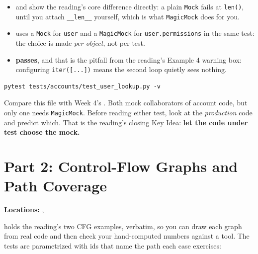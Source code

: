 \documentclass[11pt]{article}
\begin{document}
\begin{itemize}
\item {} and
show the reading's core difference directly: a plain \texttt{Mock}
fails at \texttt{len()}, until you attach \texttt{\_\_len\_\_} yourself,
which is what \texttt{MagicMock} does for you.
\item {} uses
a \texttt{Mock} for \texttt{user} and a \texttt{MagicMock} for
\texttt{user.permissions} in the same test: the choice is made
\emph{per object}, not per test.
\item {}
\textbf{passes}, and that is the pitfall from the reading's Example 4
warning box: configuring \texttt{iter([...])} means the second loop
quietly sees nothing.
\end{itemize}

\begin{lstlisting}[style=shellstyle]
pytest tests/accounts/test_user_lookup.py -v
\end{lstlisting}

\begin{tipbox}
Compare this file with Week 4's
. Both mock
collaborators of account code, but only one needs \texttt{MagicMock}.
Before reading either test, look at the \emph{production} code and
predict which. That is the reading's closing Key Idea: \textbf{let the
code under test choose the mock.}
\end{tipbox}

\section{Part 2: Control-Flow Graphs and Path Coverage}
\textbf{Locations:} ,

 holds the reading's two CFG
examples, verbatim, so you can draw each graph from real code and then
check your hand-computed numbers against a tool. The tests are
parametrized with ids that name the path each case exercises:
\end{document}
